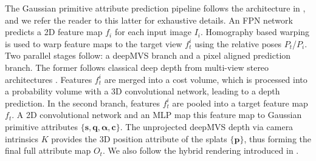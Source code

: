 The Gaussian primitive attribute prediction pipeline follows the architecture in \cite{liu2024fast}, and we refer the reader to this latter for exhaustive details. An FPN network predicts a 2D feature map $f_i$ for each input image $I_i$. Homography based warping is used to warp feature maps to the target view $f_t^i$ using the relative poses $P_t$/$P_i$. Two parallel stages follow: a deepMVS branch and a pixel aligned prediction branch. The former follows classical deep depth from multi-view stereo architectures \cite{gu2020cascade}. Features $f_t^i$ are merged into a cost volume, which is processed into a probability volume with a 3D convolutional network, leading to a depth prediction. In the second branch, features $f_t^i$ are pooled into a target feature map $f_t$. A 2D convolutional network and an MLP map this feature map to Gaussian primitive attributes ${\{\boldsymbol{s},\boldsymbol{q},\boldsymbol{\alpha},\boldsymbol{c}\}}$. The unprojected deepMVS depth via camera intrinsics $K$ provides the 3D position attribute of the splats ${\{\boldsymbol{p}\}}$, thus forming the final full attribute map $O_t$. We also follow the hybrid rendering introduced in \cite{liu2024fast}.  

  





